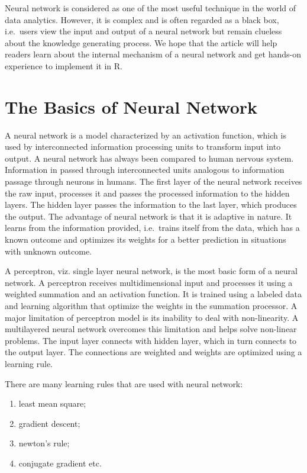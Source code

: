 \documentclass[]{book}
\providecommand{\tightlist}{%
  \setlength{\itemsep}{0pt}\setlength{\parskip}{0pt}}
\begin{document}
Neural network is considered as one of the most useful technique in the world of data analytics. However, it is complex and is often regarded as a black box, i.e.~users view the input and output of a neural network but remain clueless about the knowledge generating process. We hope that the article will help readers learn about the internal mechanism of a neural network and get hands-on experience to implement it in R.

\hypertarget{the-basics-of-neural-network}{%
\section{The Basics of Neural Network}\label{the-basics-of-neural-network}}

A neural network is a model characterized by an activation function, which is used by interconnected information processing units to transform input into output. A neural network has always been compared to human nervous system. Information in passed through interconnected units analogous to information passage through neurons in humans. The first layer of the neural network receives the raw input, processes it and passes the processed information to the hidden layers. The hidden layer passes the information to the last layer, which produces the output. The advantage of neural network is that it is adaptive in nature. It learns from the information provided, i.e.~trains itself from the data, which has a known outcome and optimizes its weights for a better prediction in situations with unknown outcome.

A perceptron, viz. single layer neural network, is the most basic form of a neural network. A perceptron receives multidimensional input and processes it using a weighted summation and an activation function. It is trained using a labeled data and learning algorithm that optimize the weights in the summation processor. A major limitation of perceptron model is its inability to deal with non-linearity. A multilayered neural network overcomes this limitation and helps solve non-linear problems. The input layer connects with hidden layer, which in turn connects to the output layer. The connections are weighted and weights are optimized using a learning rule.

There are many learning rules that are used with neural network:

\begin{enumerate}
\def\labelenumi{\alph{enumi})}
\tightlist
\item
  least mean square;
\item
  gradient descent;
\item
  newton's rule;
\item
  conjugate gradient etc.
\end{enumerate}
\end{document}
